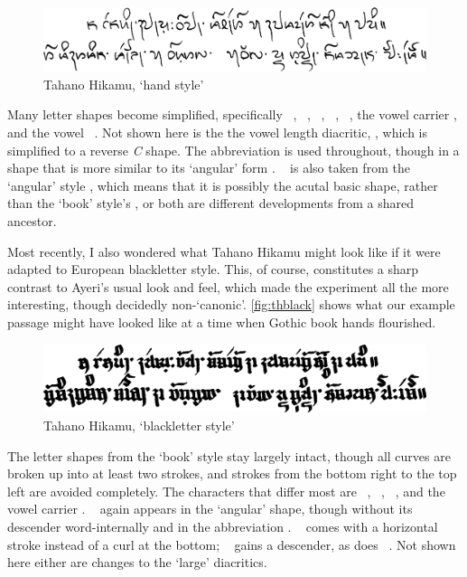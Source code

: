 \begin{figure}[ht]\centering
\includegraphics[width=0.75\linewidth]{images/tahanohand-300dpi-bw.png}
\caption{Tahano Hikamu, `hand style'}
\label{fig:thhand}
\end{figure}

Many letter shapes become simplified, specifically ~,
~, ~, ~, ~,
the vowel carrier , and the vowel ~. Not shown here is
the the vowel length diacritic, , which is simplified to a reverse
\textit{C} shape. The abbreviation  is used throughout,
though in a shape that is more similar to its `angular' form \ayr{\itshape \&}.
~ is also taken from the `angular' style , 
which means that it is possibly the acutal basic shape, rather than the `book'
style's , or both are different developments from a shared ancestor.

Most recently, I also wondered what Tahano Hikamu might look like if it were
adapted to European blackletter style. This, of course, constitutes a sharp
contrast to Ayeri's usual look and feel, which made the experiment all the more
interesting, though decidedly non-`canonic'. \autoref{fig:thblack} shows what
our example passage might have looked like at a time when Gothic book hands
flourished.

\begin{figure}[ht]\centering
\includegraphics[width=0.75\linewidth]{images/tahanoblack-300dpi-bw.png}
\caption{Tahano Hikamu, `blackletter style'}
\label{fig:thblack}
\end{figure}

The letter shapes from the `book' style stay largely intact, though all curves
are broken up into at least two strokes, and strokes from the bottom right to
the top left are avoided completely. The characters that differ most are
~, ~, ~, and the vowel carrier
. ~ again appears in the `angular' shape, though without
its descender word-internally and in the abbreviation .
~ comes with a horizontal stroke instead of a curl at the
bottom; ~ gains a descender, as does ~. Not
shown here either are changes to the `large' diacritics.

